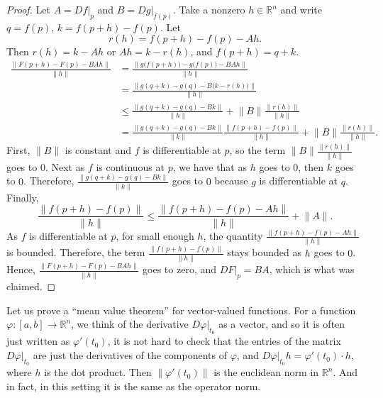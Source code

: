 \documentclass[12pt,openany]{book}
\newcommand{\snorm}[1]{\lVert {#1} \rVert}
\newcommand{\R}{{\mathbb{R}}}
\newcommand{\myquote}[1]{``#1''}
\theoremstyle{plain}
\theoremstyle{remark}
\theoremstyle{definition}
\theoremstyle{exercise}
\theoremstyle{example}
\begin{document}
\begin{proof}
Let $A = Df|_p$ and $B = Dg|_{f(p)}$.  Take a nonzero $h \in \R^n$
and write $q = f(p)$, $k = f(p+h)-f(p)$.  Let
\begin{equation*}
r(h) = f(p+h)-f(p) - A h .
\end{equation*}
Then $r(h) = k-Ah$ or $Ah = k-r(h)$, and $f(p+h) = q+k$.
\begin{equation*}
\begin{split}
\frac{\snorm{F(p+h)-F(p) - BAh}}{\snorm{h}}
& =
\frac{\snorm{g\bigl(f(p+h)\bigr)-g\bigl(f(p)\bigr) - BAh}}{\snorm{h}}
\\
& =
\frac{\snorm{g(q+k)-g(q) - B\bigl(k-r(h)\bigr)}}{\snorm{h}}
\\
& \leq
\frac
{\snorm{g(q+k)-g(q) - Bk}}
{\snorm{h}}
+
\snorm{B}
\frac
{\snorm{r(h)}}
{\snorm{h}}
\\
& =
\frac
{\snorm{g(q+k)-g(q) - Bk}}
{\snorm{k}}
\frac
{\snorm{f(p+h)-f(p)}}
{\snorm{h}}
+
\snorm{B}
\frac
{\snorm{r(h)}}
{\snorm{h}} .
\end{split}
\end{equation*}
First, $\snorm{B}$ is constant and $f$ is differentiable at $p$,
so
the term $\snorm{B}\frac{\snorm{r(h)}}{\snorm{h}}$ goes to $0$.
Next as $f$ is continuous at $p$, we have that as 
$h$ goes to $0$, then $k$ goes to $0$.  Therefore,
$\frac
{\snorm{g(q+k)-g(q) - Bk}}
{\snorm{k}}$ goes to $0$ because $g$ is differentiable at $q$.
Finally,
\begin{equation*}
\frac
{\snorm{f(p+h)-f(p)}}
{\snorm{h}}
\leq
\frac
{\snorm{f(p+h)-f(p)-Ah}}
{\snorm{h}}
+
\snorm{A} .
\end{equation*}
As $f$ is differentiable at $p$,
for small enough $h$, the quantity
$\frac{\snorm{f(p+h)-f(p)-Ah}}{\snorm{h}}$ is bounded.
Therefore, the term
$
\frac
{\snorm{f(p+h)-f(p)}}
{\snorm{h}}
$
stays bounded as $h$ goes to $0$.  Hence, 
$\frac{\snorm{F(p+h)-F(p) - BAh}}{\snorm{h}}$ goes to zero, and
$DF|_p = BA$, which is what was claimed.
\end{proof}

Let us prove a \myquote{mean value theorem} for vector-valued functions.
For a function $\varphi \colon [a,b] \to \R^n$, we think of the derivative
$D\varphi|_{t_0}$ as a vector, and so 
it is often just written as $\varphi'(t_0)$, it is not hard to check that
the entries of the matrix $D\varphi|_{t_0}$ are just the derivatives of the
components of $\varphi$, and $D\varphi|_{t_0} h = \varphi'(t_0) \cdot h$,
where $h$ is the dot product.  Then
$\snorm{\varphi'(t_0)}$
is the euclidean norm in $\R^n$.  And in fact, in this setting it is the same
as the operator norm.
\end{document}
